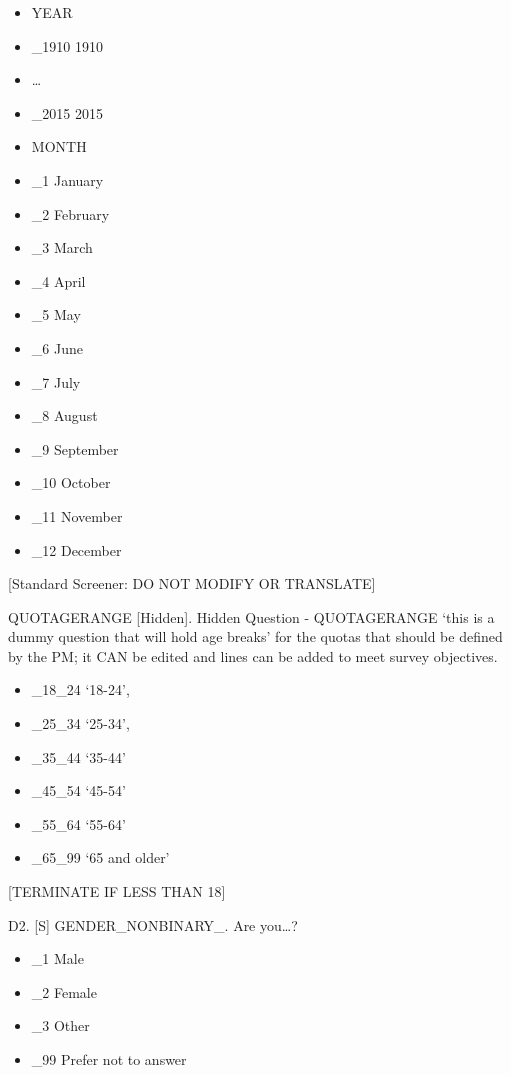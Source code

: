 \documentclass[
  12pt,
  a4paper,
]{article}
\providecommand{\tightlist}{%
  \setlength{\itemsep}{0pt}\setlength{\parskip}{0pt}}
\begin{document}
\begin{itemize}
\tightlist
\item
  YEAR
\item
  \_1910 1910
\item
  \ldots{}
\item
  \_2015 2015
\item
  MONTH
\item
  \_1 January
\item
  \_2 February
\item
  \_3 March
\item
  \_4 April
\item
  \_5 May
\item
  \_6 June
\item
  \_7 July
\item
  \_8 August
\item
  \_9 September
\item
  \_10 October
\item
  \_11 November
\item
  \_12 December
\end{itemize}

{[}Standard Screener: DO NOT MODIFY OR TRANSLATE{]}

QUOTAGERANGE {[}Hidden{]}. Hidden Question - QUOTAGERANGE `this is a dummy question that will hold age breaks' for the quotas that should be defined by the PM; it CAN be edited and lines can be added to meet survey objectives.

\begin{itemize}
\tightlist
\item
  \_18\_24 `18-24',
\item
  \_25\_34 `25-34',
\item
  \_35\_44 `35-44'
\item
  \_45\_54 `45-54'
\item
  \_55\_64 `55-64'
\item
  \_65\_99 `65 and older'
\end{itemize}

{[}TERMINATE IF LESS THAN 18{]}

D2. {[}S{]} GENDER\_NONBINARY\_. Are you\ldots?

\begin{itemize}
\tightlist
\item
  \_1 Male
\item
  \_2 Female
\item
  \_3 Other
\item
  \_99 Prefer not to answer
\end{itemize}
\end{document}
